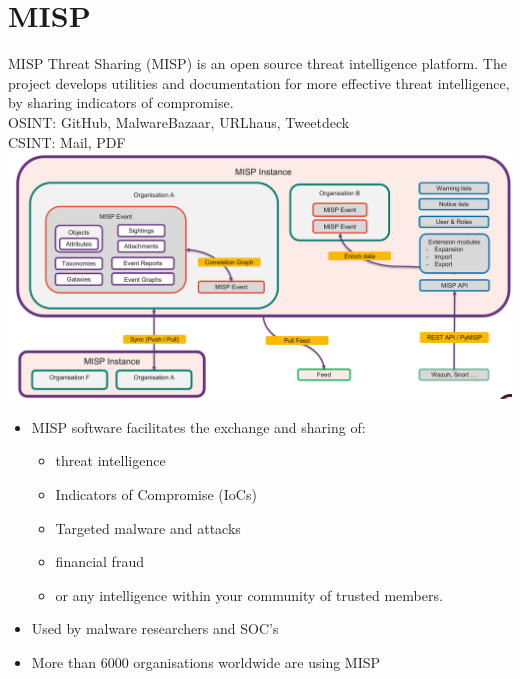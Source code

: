 

\section{MISP}
MISP Threat Sharing (MISP) is an open source threat intelligence platform. The project develops utilities and documentation for more effective threat intelligence, by sharing indicators of compromise.\\

OSINT: GitHub, MalwareBazaar, URLhaus, Tweetdeck\\
CSINT: Mail, PDF\\
\includegraphics[width=\linewidth]{./img/15-misp/misp.png}
\begin{itemize}
    \item MISP software facilitates the exchange and sharing of:
    \begin{itemize}
        \item threat intelligence
        \item Indicators of Compromise (IoCs)
        \item Targeted malware and attacks
        \item financial fraud
        \item or any intelligence within your community of trusted members.
    \end{itemize}
    \item Used by malware researchers and SOC's
    \item More than 6000 organisations worldwide are using MISP
\end{itemize}

